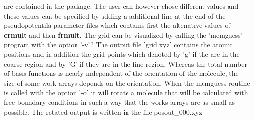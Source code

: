 \documentclass[a4paper,11pt]{report}
\begin{document}
are contained in the package. The user can however chose different values and these values can be specified by 
adding a additional line at the end of the pseudopotentila parameter files which contains first the altenative 
values of {\bf crmult} and then {\bf frmult}. The grid can be visualized by calling the 'memguess' program 
with the option '-y'? The output file 'grid.xyz' contains the atomic positions and in addition 
the grid points which denoted by 'g' if the are in the coarse region and by 'G' if they are in the fine region. 
Whereas the total number of basis functions is nearly independent of the orientation of the molecule, the size of some 
work arrays depends on the orientation. When the memguess routine is called with the option '-o' it will rotate 
a molecule that will be calculated with free boundary conditions in such a way that the works arrays are as small as 
possible. The rotated output is written in the file posout\_000.xyz.
\end{document}
